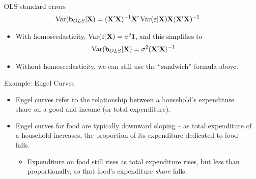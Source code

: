 \begin{frame}{OLS standard errors}
\[
\operatorname { Var } ({\bf b}_{OLS} | {\bf X}) = ({\bf X} '{\bf X} )^{-1} {\bf X}' \operatorname { Var } ( \mathbf{\varepsilon} | \mathbf { X } )  {\bf X}  ({\bf X} '{\bf X} )^{-1}
\]
\begin{itemize}

\smallskip
\item With homoscedasticity, $\operatorname { Var } ( \mathbf{\varepsilon} | \mathbf { X } ) = \sigma^2 {\bf I}$, and
this simplifies to \[
\operatorname { Var } ({\bf b}_{OLS} | {\bf X}) =  \sigma^2 ({\bf X} '{\bf X} )^{-1} 
\]

\smallskip
\item Without homoscedasticity, we can still use the ``sandwich'' formula above. 
\end{itemize}
\end{frame}



\begin{frame}{Example: Engel Curves}
\begin{itemize}
	\item Engel curves refer to the relationship between a household's expenditure share on a 
	good and income (or total expenditure).

	\item Engel curves for food are typically downward sloping -- as total expenditure of a household
	increases, the proportion of its expenditure dedicated to food falls.
	\begin{itemize}
		\item Expenditure on food still rises as total expenditure rises, but less than proportionally,
		so that food's expenditure \emph{share} falls.
	\end{itemize}
\end{itemize}
\end{frame}



